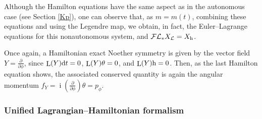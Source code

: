 \documentclass[12pt]{report}
\def\dst{\displaystyle}
\def\derpar#1#2{\frac{\partial{#1}}{\partial{#2}}}
\def\Lag{{\cal L}}
\def\d{{\rm d}}
\def\Lie{\mathop{\rm L}\nolimits}
\def\inn{\mathop{i}\nolimits}
\def\Leg{{\cal F}\Lag}
\begin{document}
Although the Hamilton equations have the same aspect as in the
autonomous case (see Section \ref{Kp}), one can observe that,
as $m=m(t)$, combining these equations and
using the Legendre map, we obtain, in fact,
the Euler--Lagrange equations for this nonautonomous system,
and $\Leg_*X_\Lag=X_{\rm h}$.

Once again, a Hamiltonian exact Noether symmetry is given by 
the vector field $\dst Y=\derpar{}{\phi}$, since
$\dst\Lie(Y)\d t=0$, $\Lie(Y)\theta=0$,
and $\Lie(Y){\rm h}=0$.
Then, as the last Hamilton equation shows,
the associated conserved quantity is again the angular momentum
$\dst f_Y=\inn\left(\derpar{}{\phi}\right)\theta=p_\phi$.

\subsubsection{Unified Lagrangian--Hamiltonian formalism}
\end{document}
